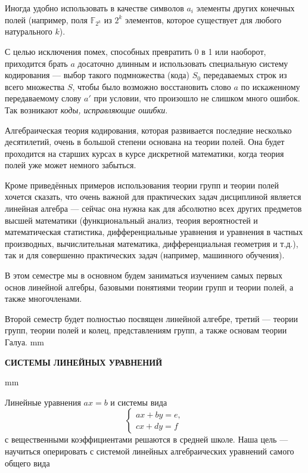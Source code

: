 \documentclass[12pt,english,russian]{article}
\begin{document}
	Иногда удобно использовать в качестве символов $a_i$ элементы других конечных полей (например, поля $\mathbb F_{2^k}$
	из $2^k$ элементов, которое существует для любого натурального $k$).

	С целью исключения помех, способных превратить 0 в 1 или
	наоборот, приходится брать $a$ досаточно длинным и использовать
	специальную систему кодирования --- выбор такого подмножества (кода)
	$S_0$ передаваемых строк из всего множества $S$, чтобы было возможно восстановить слово $a$
	по искаженному передаваемому слову
	$a'$ при условии, что произошло не слишком много ошибок.
	Так возникают \textit{коды, исправляющие ошибки}.

	Алгебраическая теория кодирования, которая развивается последние 
	несколько десятилетий, очень в большой степени основана 
	на теории полей. Она будет проходится на старших курсах
	в курсе дискретной математики, когда теория полей уже может
	немного забыться.

	Кроме приведённых примеров использования теории групп и
	теории полей хочется сказать, что очень важной для практических 
	задач дисциплиной является линейная алгебра --- сейчас она
	нужна как для абсолютно всех других предметов высшей математики 
	(функциональный анализ, теория вероятностей и математическая 
	статистика, дифференциальные уравнения и уравнения в
	частных производных, вычислительная математика, дифференциальная геометрия и т.д.), так и для совершенно практических
	задач (например, машинного обучения).


	В этом семестре мы в основном будем заниматься изучением
	самых первых основ линейной алгебры, базовыми понятиями теории 
	групп и теории полей, а также многочленами.

	Второй семестр будет полностью посвящен линейной алгебре,
	третий --- теории групп, теории полей и колец, представлениям
	групп, а также основам теории Галуа.
	 mm
	\begin{center}
		{\large {\bf СИСТЕМЫ ЛИНЕЙНЫХ УРАВНЕНИЙ }  }
	\end{center}
	 mm


	Линейные уравнения $ax = b$ и системы вида
	$$
		\begin{cases}
			ax + by =e,\\
			cx + dy = f
		\end{cases}
	$$
	с вещественными коэффициентами решаются в средней школе.
	Наша цель --- научиться оперировать с системой линейных алгебраических 
	уравнений самого общего вида
\end{document}
